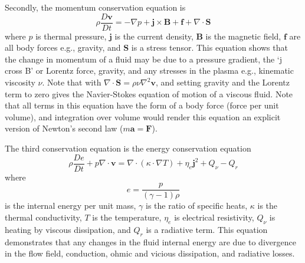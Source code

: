 Secondly, the momentum conservation equation is
\begin{equation}
\rho\frac{D\mathbf{v}}{Dt}=-\nabla p + \mathbf{j}\times \mathbf{B} + \mathbf{f} +\nabla \cdot \mathbf{S}
\label{eqn:mhd_momentum}
\end{equation}
where $p$ is thermal pressure, $\mathbf{j}$ is the current density, $\mathbf{B}$ is the magnetic field, $\mathbf{f}$ are all body forces e.g., gravity, and $\mathbf{S}$ is a stress tensor. This equation shows that the change in momentum of a fluid may be due to a pressure gradient, the \textquoteleft j cross B' or Lorentz force, gravity, and any stresses in the plasma e.g., kinematic viscosity $\nu$. Note that with $\nabla \cdot \mathbf{S}=\rho\nu\nabla^2\mathbf{v} $, and setting gravity and the Lorentz term to zero gives the Navier-Stokes equation of motion of a viscous fluid. Note that all terms in this equation have the form of a body force (force per unit volume), and integration over volume would render this equation an explicit version of Newton's second law ($m\mathbf{a}=\mathbf{F}$).

The third conservation equation is the energy conservation equation
\begin{equation}
\rho\frac{De}{Dt} + p\nabla\cdot \mathbf{v}=\nabla\cdot(\kappa\cdot\nabla T) +  \eta_e\mathbf{j}^2 + Q_{\nu} - Q_r
\end{equation}
where 
\begin{equation}
e = \frac{p}{(\gamma-1)\rho}
\end{equation}
is the internal energy per unit mass, $\gamma$ is the ratio of specific heats, $\kappa$ is the thermal conductivity, $T$ is the temperature, $\eta_e$ is electrical resistivity, $Q_{\nu}$ is heating by viscous dissipation, and $Q_r$ is a radiative term. This equation demonstrates that any changes in the fluid internal energy are due to divergence in the flow field, conduction, ohmic and vicious dissipation, and radiative losses.

